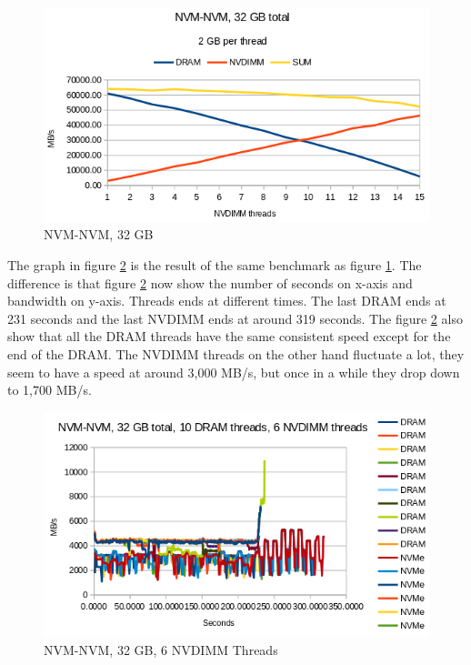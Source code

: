 \documentclass[12pt,a4paper,USenglish]{article}      %
\begin{document}
\begin{figure}[!hbtp]
\includegraphics[scale=0.7]{Benchmarks/NVM-NVM_32GB_Figure.png}
\caption{NVM-NVM, 32 GB}
\label{fig:NVM_NVM}
\end{figure}

The graph in figure \ref{fig:NVM_NVM_sec} is the result of the same benchmark as figure \ref{fig:NVM_NVM}. The difference is that figure \ref{fig:NVM_NVM_sec} now show the number of seconds on x-axis and bandwidth on y-axis. Threads ends at different times. The last DRAM ends at 231 seconds and the last NVDIMM ends at around 319 seconds. The figure \ref{fig:NVM_NVM_sec} also show that all the DRAM threads have the same consistent speed except for the end of the DRAM. The NVDIMM threads on the other hand fluctuate a lot, they seem to have a speed at around 3,000 MB/s, but once in a while they drop down to 1,700 MB/s.
\begin{figure}[!hbtp]
\includegraphics[scale=0.7]{Benchmarks/NVM-NVM_32GB_6_Thread.png}
\caption{NVM-NVM, 32 GB, 6 NVDIMM Threads}
\label{fig:NVM_NVM_sec}
\end{figure}
\end{document}
